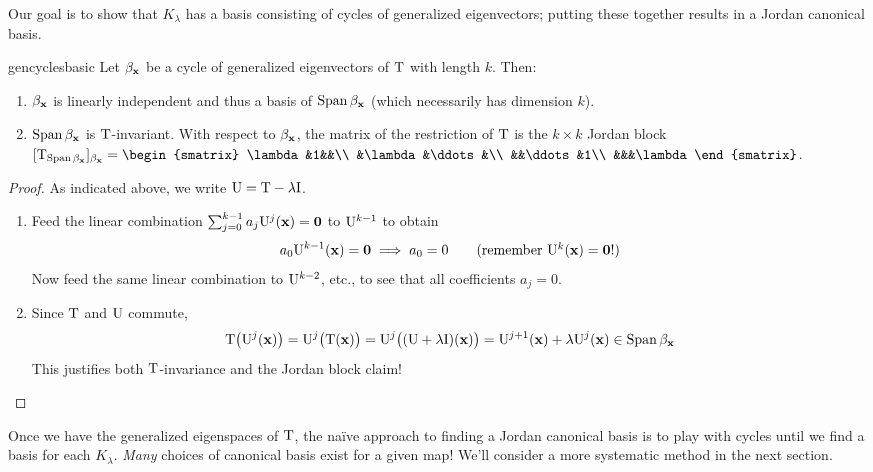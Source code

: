Our goal is to show that $K_\lambda$ has a basis consisting of cycles of generalized eigenvectors; putting these together results in a Jordan canonical basis.

\begin{lemm}{}{gencyclesbasic}
	Let $\beta_{\mathbf{x}}$ be a cycle of generalized eigenvectors of $\mathrm{T}$ with length $k$. Then:
	\begin{enumerate}
	  \item $\beta_{\mathbf{x}}$ is linearly independent and thus a basis of $\operatorname{Span}\beta_{\mathbf{x}}$ (which necessarily has dimension $k$).
	  \item $\operatorname{Span}\beta_{\mathbf{x}}$ is $\mathrm{T}$-invariant. With respect to $\beta_{\mathbf{x}}$, the matrix of the restriction of $\mathrm{T}$ is the $k\times k$ Jordan block $[\rT_{\Span\beta_\vx}]_{\beta_\vx}=
	  \begin{smatrix}
		  \lambda&1&&\\
		  &\lambda&\ddots&\\
		  &&\ddots&1\\
		  &&&\lambda
	  \end{smatrix}$.
	\end{enumerate}
\end{lemm}



\begin{proof}
	As indicated above, we write $\mathrm{U}=\mathrm{T}-\lambda\mathrm{I}$.
	\begin{enumerate}
	  \item Feed the linear combination $\sum_{j=0}^{k-1}a_j\mathrm{U}^j({\mathbf{x}})=\mathbf{0}$ to $\mathrm{U}^{k-1}$ to obtain
	  \[
	  	a_0\rU^{k-1}(\vx)=\V0\implies a_0=0
	  	\tag{remember $\rU^k(\vx)=\V0$!}
	  \]
	  Now feed the same linear combination to $\mathrm{U}^{k-2}$, etc., to see that all coefficients $a_j=0$.
	  \item Since $\mathrm{T}$ and $\mathrm{U}$ commute,
	  \[
	  	\mathrm{T}\bigl(\mathrm{U}^j({\mathbf{x}})\bigr)=\mathrm{U}^j\bigl(\mathrm{T}({\mathbf{x}})\bigr)=\mathrm{U}^j\bigl((\mathrm{U}+\lambda\mathrm{I})({\mathbf{x}})\bigr)=\mathrm{U}^{j+1}({\mathbf{x}})+\lambda\mathrm{U}^j({\mathbf{x}})\in\operatorname{Span}\beta_{\mathbf{x}}
	  \]
	  This justifies both $\mathrm{T}$-invariance and the Jordan block claim!\qedhere
	\end{enumerate}
\end{proof}


\pagebreak[3]


Once we have the generalized eigenspaces of $\mathrm{T}$, the naïve approach to finding a Jordan canonical basis is to play with cycles until we find a basis for each $K_\lambda$. \emph{Many} choices of canonical basis exist for a given map! We'll consider a more systematic method in the next section.

